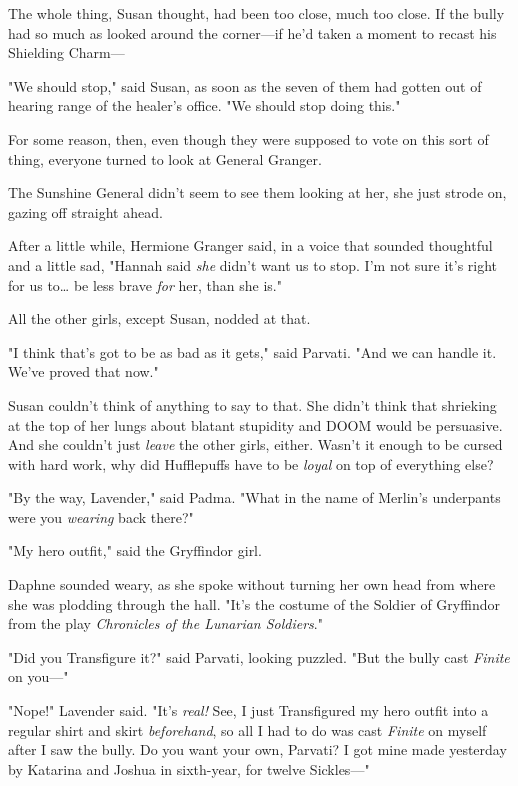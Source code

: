 The whole thing, Susan thought, had been too close, much too close. If the 
bully had so much as looked around the corner---if he'd taken a moment to 
recast his Shielding Charm---

"We should stop," said Susan, as soon as the seven of them had gotten out of 
hearing range of the healer's office. "We should stop doing this."

For some reason, then, even though they were supposed to vote on this sort of 
thing, everyone turned to look at General Granger.

The Sunshine General didn't seem to see them looking at her, she just strode 
on, gazing off straight ahead.

After a little while, Hermione Granger said, in a voice that sounded thoughtful 
and a little sad, "Hannah said \emph{she} didn't want us to stop. I'm not sure 
it's right for us to{\ldots} be less brave \emph{for} her, than she is."

All the other girls, except Susan, nodded at that.

"I think that's got to be as bad as it gets," said Parvati. "And we can handle 
it. We've proved that now."

Susan couldn't think of anything to say to that. She didn't think that 
shrieking at the top of her lungs about blatant stupidity and DOOM would be 
persuasive. And she couldn't just \emph{leave} the other girls, either. Wasn't 
it enough to be cursed with hard work, why did Hufflepuffs have to be 
\emph{loyal} on top of everything else?

"By the way, Lavender," said Padma. "What in the name of Merlin's underpants 
were you \emph{wearing} back there?"

"My hero outfit," said the Gryffindor girl.

Daphne sounded weary, as she spoke without turning her own head from where she 
was plodding through the hall. "It's the costume of the Soldier of Gryffindor 
from the play \emph{Chronicles of the Lunarian Soldiers}."

"Did you Transfigure it?" said Parvati, looking puzzled. "But the bully cast 
\emph{Finite} on you---"

"Nope!" Lavender said. "It's \emph{real!} See, I just Transfigured my hero 
outfit into a regular shirt and skirt \emph{beforehand}, so all I had to do was 
cast \emph{Finite} on myself after I saw the bully. Do you want your own, 
Parvati? I got mine made yesterday by Katarina and Joshua in sixth-year, for 
twelve Sickles---"

